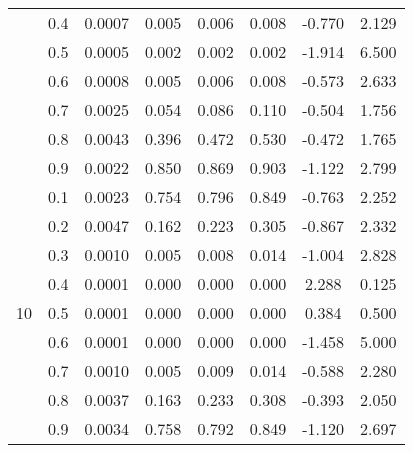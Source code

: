 \documentclass[11pt,a4paper]{report}
\begin{document}
\begin{longtable}{ | c | c || c | c | c | c | c | c | }
 & 0.4 & 0.0007 & 0.005 & 0.006 & 0.008 & -0.770 & 2.129 \\
 & 0.5 & 0.0005 & 0.002 & 0.002 & 0.002 & -1.914 & 6.500 \\
 & 0.6 & 0.0008 & 0.005 & 0.006 & 0.008 & -0.573 & 2.633 \\
 & 0.7 & 0.0025 & 0.054 & 0.086 & 0.110 & -0.504 & 1.756 \\
 & 0.8 & 0.0043 & 0.396 & 0.472 & 0.530 & -0.472 & 1.765 \\
 & 0.9 & 0.0022 & 0.850 & 0.869 & 0.903 & -1.122 & 2.799 \\
 \hline
\multirow{9}{*}{10} & 0.1 & 0.0023 & 0.754 & 0.796 & 0.849 & -0.763 & 2.252 \\
 & 0.2 & 0.0047 & 0.162 & 0.223 & 0.305 & -0.867 & 2.332 \\
 & 0.3 & 0.0010 & 0.005 & 0.008 & 0.014 & -1.004 & 2.828 \\
 & 0.4 & 0.0001 & 0.000 & 0.000 & 0.000 & 2.288 & 0.125 \\
 & 0.5 & 0.0001 & 0.000 & 0.000 & 0.000 & 0.384 & 0.500 \\
 & 0.6 & 0.0001 & 0.000 & 0.000 & 0.000 & -1.458 & 5.000 \\
 & 0.7 & 0.0010 & 0.005 & 0.009 & 0.014 & -0.588 & 2.280 \\
 & 0.8 & 0.0037 & 0.163 & 0.233 & 0.308 & -0.393 & 2.050 \\
 & 0.9 & 0.0034 & 0.758 & 0.792 & 0.849 & -1.120 & 2.697 \\
 \hline
\hline
\end{longtable}
\end{document}
